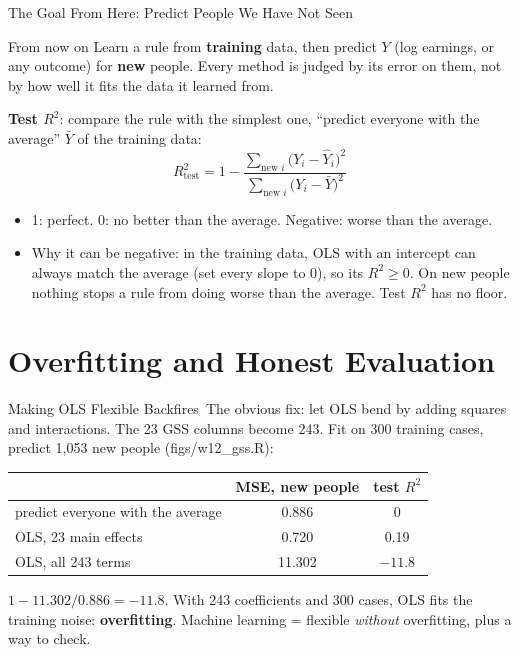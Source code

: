 \documentclass[aspectratio=169,11pt,xcolor=dvipsnames]{beamer}
\newcommand{\srcp}[1]{{\scriptsize\color{gray}(#1)}}
\newcommand{\core}{\,\raisebox{0.6pt}{\textcolor{corestar}{$\bigstar$}}}
\begin{document}
\begin{frame}{The Goal From Here: Predict People We Have Not Seen\core}
\begin{block}{From now on}
Learn a rule from \textbf{training} data, then predict $Y$ (log earnings, or any outcome)
for \textbf{new} people. Every method is judged by its error on them, not by how well it
fits the data it learned from.
\end{block}
\vskip4pt
\textbf{Test $R^2$}: compare the rule with the simplest one, ``predict everyone with the
average'' $\bar Y$ of the training data:
\[
  R^2_{\text{test}} = 1 - \frac{\sum_{\text{new } i}\big(Y_i - \hat Y_i\big)^2}{\sum_{\text{new } i}\big(Y_i - \bar Y\big)^2}
\]
\vskip-4pt
\begin{itemize}\itemsep3pt
  \item 1: perfect. 0: no better than the average. \alert{Negative: worse than the average.}
  \item Why it can be negative: in the training data, OLS with an intercept can always
        match the average (set every slope to 0), so its $R^2 \geq 0$. On new people nothing
        stops a rule from doing worse than the average. Test $R^2$ has no floor.
\end{itemize}
\end{frame}

\section[Overfitting]{Overfitting and Honest Evaluation}
\begin{frame}\sectionpage\end{frame}

\begin{frame}{Making OLS Flexible Backfires\core}
The obvious fix: let OLS bend by adding squares and interactions. The 23 GSS columns
become 243.
\vskip4pt
Fit on 300 training cases, predict 1,053 new people \srcp{figs/w12\_gss.R}:
\begin{center}\small
\renewcommand{\arraystretch}{1.0}
\begin{tabular}{@{}lcc@{}}
\toprule
& MSE, new people & test $R^2$ \\
\midrule
predict everyone with the average & 0.886 & 0 \\
OLS, 23 main effects & 0.720 & 0.19 \\
OLS, all 243 terms & 11.302 & \alert{$-11.8$} \\
\bottomrule
\end{tabular}
\end{center}
{\small $1 - 11.302/0.886 = -11.8$. With 243 coefficients and 300 cases, OLS fits the training
noise: \textbf{overfitting}. Machine learning = flexible \emph{without} overfitting, plus a way to check.}
\end{frame}
\end{document}
